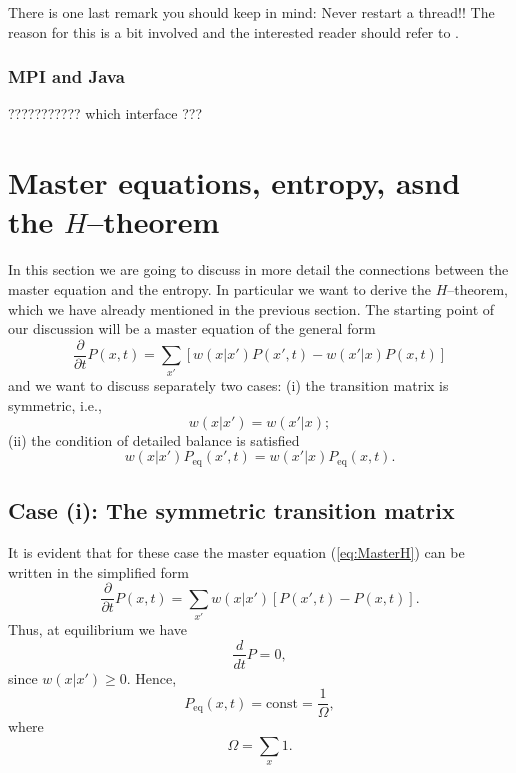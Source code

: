 There is one last remark you should keep in mind: Never restart a thread!! 
The reason for this is a bit involved and the interested reader should
refer to \cite[]{JavaThreads}.

\subsubsection{MPI and Java}

??????????? which interface ???



\section{Master equations, entropy, asnd the $H$--theorem}
In this section we are going to discuss in more detail the connections between
the master equation and the entropy. In particular we want to derive the
$H$--theorem, which we have already mentioned in the previous section. 
The starting point of our discussion will be a master equation of the general
form
\begin{equation}
\label{eq:MasterH}
  \frac{\partial}{\partial t} P(x,t) = \sum_{x'} 
   [w(x|x') P(x',t) - w(x'|x) P(x,t)]
\end{equation}
and we want to discuss separately two cases: (i) the transition matrix is
symmetric, i.e.,
\begin{displaymath}
  w(x|x') = w(x'|x);
\end{displaymath}
(ii) the condition of detailed balance is satisfied
\begin{equation}
\label{eq:MasterDetBal}
  w(x|x') P_{\textrm{eq}}(x',t) = w(x'|x) P_{\textrm{eq}}(x,t).
\end{equation}

\subsection{Case (i): The symmetric transition matrix}
It is evident that for these case the master equation (\ref{eq:MasterH}) can
be written in the simplified form
\begin{equation}
\label{eq:MasterHSym}
  \frac{\partial}{\partial t} P(x,t) = \sum_{x'} 
   w(x|x') [P(x',t) - P(x,t)].
\end{equation}
Thus, at equilibrium we have
\begin{displaymath}
  \frac{d}{dt}P = 0,
\end{displaymath}
since $w(x|x') \ge 0$. Hence,
\begin{equation}
\label{eq:MasterHEqSym}
  P_{\textrm{eq}} (x,t) = \textrm{const} = \frac{1}{\Omega},
\end{equation}
where 
\begin{displaymath}
  \Omega = \sum_x 1.
\end{displaymath}

